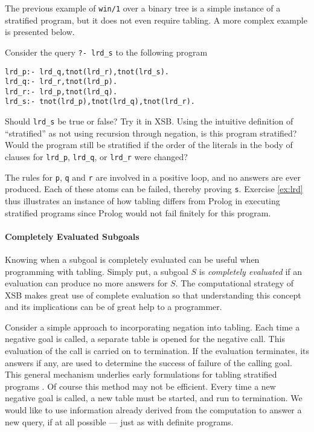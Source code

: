 The previous example of {\tt win/1} over a binary tree is a simple
instance of a stratified program, but it does not even require
tabling.  A more complex example is presented below.

\begin{exercise} \label{ex:lrd}
Consider the query {\tt ?- lrd\_s} to the following program
\begin{verbatim}
lrd_p:- lrd_q,tnot(lrd_r),tnot(lrd_s).
lrd_q:- lrd_r,tnot(lrd_p).
lrd_r:- lrd_p,tnot(lrd_q).
lrd_s:- tnot(lrd_p),tnot(lrd_q),tnot(lrd_r). 
\end{verbatim}
Should {\tt lrd\_s} be true or false?  Try it in XSB\@.  Using the
intuitive definition of ``stratified'' as not using recursion through
negation, is this program stratified?  Would the program still be
stratified if the order of the literals in the body of clauses for
{\tt lrd\_p}, {\tt lrd\_q}, or {\tt lrd\_r} were changed?
\end{exercise}

The rules for {\tt p}, {\tt q} and {\tt r} are involved in a positive
loop, and no answers are ever produced.  Each of these atoms can be
failed, thereby proving {\tt s}.  Exercise \ref{ex:lrd} thus
illustrates an instance of how tabling differs from Prolog in
executing stratified programs since Prolog would not fail finitely for
this program.

\paragraph*{Completely Evaluated Subgoals}

Knowing when a subgoal is completely evaluated can be useful when
programming with tabling.  Simply put, a subgoal $S$ is {\em completely
evaluated} if an evaluation can produce no more answers for $S$\@.  The
computational strategy of XSB makes great use of complete evaluation
so that understanding this concept and its implications can be of
great help to a programmer.

Consider a simple approach to incorporating negation into tabling.
Each time a negative goal is called, a separate table is opened for
the negative call.  This evaluation of the call is carried on to
termination.  If the evaluation terminates, its answers if any, are
used to determine the success of failure of the calling goal.  This
general mechanism underlies early formulations for tabling stratified
programs \cite{KeTo88,Seki89}.  Of course this method may not be
efficient.  Every time a new negative goal is called, a new table must
be started, and run to termination.  We would like to use information
already derived from the computation to answer a new query, if at all
possible --- just as with definite programs.

